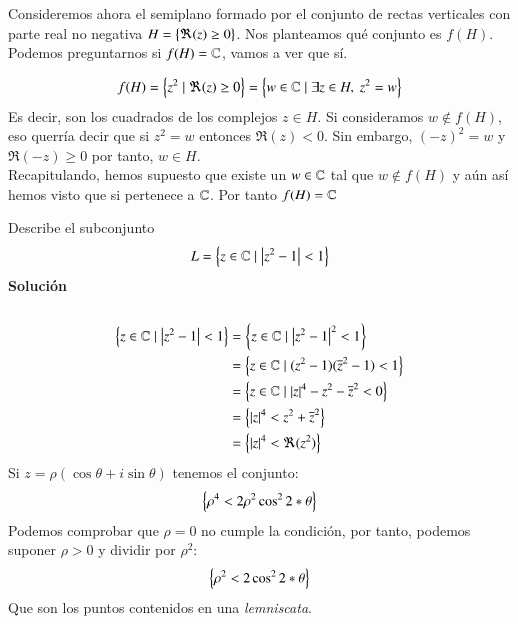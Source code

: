     Consideremos ahora el semiplano formado por el conjunto de rectas verticales con parte real no negativa $H = \left\{\Re(z) \geq 0\right\}$. Nos planteamos qué conjunto es $f(H)$. Podemos preguntarnos si $f(H) = \mathbb{C}$, vamos a ver que sí.

    $$
        f(H) = \left\{z^2 \mid \Re(z) \geq 0\right\} = \left\{w \in \mathbb{C} \mid \exists z \in H,\ z^2 = w\right\}
    $$
    Es decir, son los cuadrados de los complejos $z \in H$. Si consideramos $w \notin f(H)$, eso querría decir que si $z^2 = w$ entonces $\Re(z) < 0$. Sin embargo, $(-z)^2 = w$ y $\Re(-z) \geq 0$ por tanto, $w \in H$.\\
    Recapitulando, hemos supuesto que existe un $w \in \mathbb{C}$ tal que $w \notin f(H)$ y aún así hemos visto que si pertenece a $\mathbb{C}$. Por tanto $f(H) = \mathbb{C}$

    \begin{th_ex}
        Describe el subconjunto
        $$
            L = \left\{z \in \mathbb{C} \mid \left|z^2-1\right| < 1\right\}
        $$
        \textbf{Solución}\\\\

        \begin{align*}
            \left\{z \in \mathbb{C} \mid \left|z^2-1\right| < 1\right\} &= \left\{z \in \mathbb{C} \mid \left|z^2-1\right|^2 < 1\right\}\\
            &= \left\{z \in \mathbb{C} \mid (z^2-1)(\overline{z} ^2 - 1) < 1\right\}\\
            &= \left\{z \in \mathbb{C} \mid \left|z\right|^4 - z^2 - \overline{z} ^2 < 0\right\}\\
            &= \left\{\left|z\right|^4 < z^2 + \overline{z} ^2\right\}\\
            &= \left\{\left|z\right|^4 < \Re(z^2)\right\}
        \end{align*}
        Si $z = \rho (\cos \theta + i \sin \theta)$ tenemos el conjunto:
        $$
            \left\{\rho^4 < 2 \rho^2 \cos^2 2*\theta\right\}
        $$
        Podemos comprobar que $\rho = 0$ no cumple la condición, por tanto, podemos suponer $\rho > 0$ y dividir por $\rho^2$:
        $$
            \left\{\rho^2 < 2 \cos^2 2*\theta\right\}
        $$
        Que son los puntos contenidos en una \textit{lemniscata}.
    \end{th_ex}

